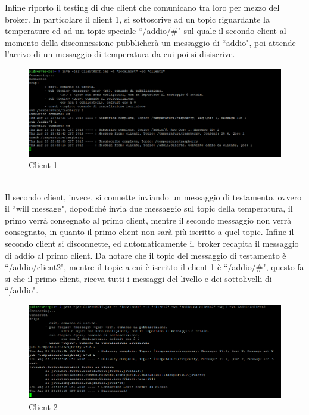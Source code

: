 \documentclass{article}
\begin{document}
Infine riporto il testing di due client che comunicano tra loro per mezzo del broker. In particolare il client 1, si sottoscrive ad un topic riguardante la temperature ed ad un topic speciale ``/addio/\#" sul quale il secondo client al momento della disconnessione pubblicherà un messaggio di ``addio", poi attende l'arrivo di un messaggio di temperatura da cui poi si disiscrive.
\begin{figure}[htbp]
	\centerline{\includegraphics[scale=0.5]{immagini/test_client1.PNG}}
	\caption{Client 1}
\end{figure}\\
Il secondo client, invece, si connette inviando un messaggio di testamento, ovvero il ``will message", dopodiché invia due messaggio sul topic della temperatura, il primo verrà consegnato al primo client, mentre il secondo messaggio non verrà consegnato, in quanto il primo client non sarà più iscritto a quel topic. Infine il secondo client si disconnette, ed automaticamente il broker recapita il messaggio di addio al primo client. Da notare che il topic del messaggio di testamento è ``/addio/client2", mentre il topic a cui è iscritto il client 1 è ``/addio/\#", questo fa si che il primo client, riceva tutti i messaggi del livello e dei sottolivelli di ``/addio".\newpage
\begin{figure}[htbp]
	\centerline{\includegraphics[scale=0.5]{immagini/test_client2.PNG}}
	\caption{Client 2}
\end{figure}
\end{document}

